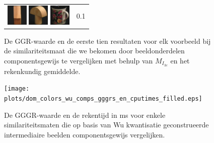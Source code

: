 {\begin{figure}[p]
\begin{tabular}{m{11cm} | m{3cm} |}
\includegraphics[width=1cm]{coil/beeld-44.eps}
\includegraphics[width=1cm]{coil/beeld-4.eps}
\includegraphics[width=1cm]{coil/beeld-64.eps}
& {\scriptsize 0.1}
\\
\end{tabular}
\vspace{5pt}
\caption{\label{fig:results_beste_multires_pixelgeb}De GGR-waarde en de eerste tien resultaten 
voor elk voorbeeld bij de similariteitsmaat die we bekomen door 
beeldonderdelen componentsgewijs te vergelijken met behulp van $M_{I_{3c}}$ en het rekenkundig gemiddelde.}
\end{figure}

\begin{figure}[p]
\centering
\texttt{[image: plots/dom\_colors\_wu\_comps\_gggrs\_en\_cputimes\_filled.eps]}
\vspace{1pt}
\caption{\label{fig:dom_colors_wu_comps_gggrs_en_cputimes}De GGGR-waarde en de rekentijd in ms 
voor enkele similariteitsmaten die
op basis van Wu kwantisatie geconstrueerde intermediaire beelden componentsgewijs vergelijken.}
\end{figure}

}
